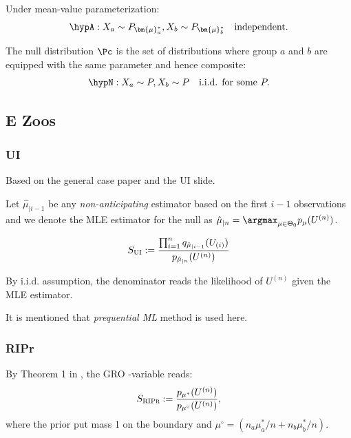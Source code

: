 Under mean-value parameterization:
\begin{align*}
	\hypA: X_a \sim P_{\bm{\mu}_a^*}, X_b \sim P_{\bm{\mu}_b^*} \quad
	\text{independent}.
\end{align*}

The null distribution $\Pc$ is the set of distributions where group $a$ and $b$
are equipped with the same parameter and hence composite:
\begin{align*}
	\hypN: X_a \sim P, X_b \sim P \quad
	\text{i.i.d. for some } P.
\end{align*}

\clearpage

\subsection{E Zoos}

\subsubsection{UI}

Based on the general case paper and the UI slide.

Let $\hat{\mu}_{\mid i-1}$ be any \emph{non-anticipating}
estimator based on the first $i-1$ observations and we
denote the MLE estimator for the null as
$\hat{\mu}_{\mid n} = \argmax_{\mu\in\Theta_0} p_{\mu}(U^{{(n)}})$.

\begin{align*}
	S_{\textsc{UI}} := \frac{\prod_{i=1}^n q_{\hat{\mu}_{\mid i-1}} (U_{(i)})}{p_{\hat{\mu}_{\mid n}}(U^{(n)})}
\end{align*}

By i.i.d. assumption, the denominator reads the likelihood of $U^{(n)}$ given the MLE estimator.

It is mentioned that \emph{prequential ML} method is used here.


\subsubsection{RIPr}

By Theorem 1 in \cite{turnerExactAnytimevalidConfidence2023}, the GRO \E-variable
reads:
\begin{align*}
	S_{\textsc{RIPr}} := \frac{p_{\mu^*}(U^{(n)})}{p_{\mu^\circ}(U^{(n)})},
\end{align*}
where the prior put mass 1 on the boundary and $\mu^\circ = (n_a\mu^*_a/n + n_b \mu^*_b/n)$.

